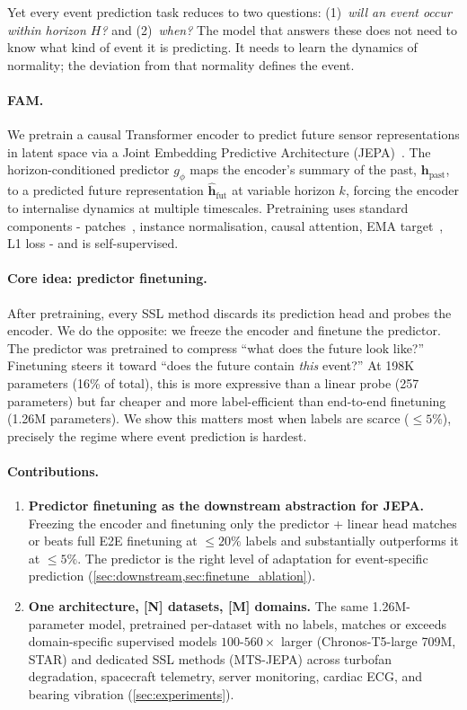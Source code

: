 \documentclass{article}
\newcommand{\placeholder}[1]{{\color{red}\textbf{[#1]}}}
\newcommand{\placeholder}[1]{#1}
\newcommand{\h}{\mathbf{h}}
\newcommand{\predictor}{g_\phi}
\begin{document}
Yet every event prediction task reduces to two questions: (1)~\emph{will an event occur within horizon $H$?} and (2)~\emph{when?} The model that answers these does not need to know what kind of event it is predicting. It needs to learn the dynamics of normality; the deviation from that normality defines the event.

\paragraph{FAM.} We pretrain a causal Transformer encoder to predict future sensor representations in latent space via a Joint Embedding Predictive Architecture (JEPA)~\citep{assran2023ijepa}. The horizon-conditioned predictor $\predictor$ maps the encoder's summary of the past, $\h_\text{past}$, to a predicted future representation $\hat{\h}_\text{fut}$ at variable horizon $k$, forcing the encoder to internalise dynamics at multiple timescales. Pretraining uses standard components - patches~\citep{nie2023patchtst}, instance normalisation, causal attention, EMA target~\citep{assran2023ijepa}, L1 loss - and is self-supervised.

\paragraph{Core idea: predictor finetuning.} After pretraining, every SSL method discards its prediction head and probes the encoder. We do the opposite: we freeze the encoder and finetune the predictor. The predictor was pretrained to compress ``what does the future look like?'' Finetuning steers it toward ``does the future contain \emph{this} event?'' At 198K parameters (16\% of total), this is more expressive than a linear probe (257 parameters) but far cheaper and more label-efficient than end-to-end finetuning (1.26M parameters). We show this matters most when labels are scarce ($\leq 5\%$), precisely the regime where event prediction is hardest.

\paragraph{Contributions.}
\begin{enumerate}[nosep]
  \item \textbf{Predictor finetuning as the downstream abstraction for JEPA.} Freezing the encoder and finetuning only the predictor + linear head matches or beats full E2E finetuning at $\leq 20\%$ labels and substantially outperforms it at $\leq 5\%$. The predictor is the right level of adaptation for event-specific prediction (\cref{sec:downstream,sec:finetune_ablation}).

  \item \textbf{One architecture, \placeholder{N} datasets, \placeholder{M} domains.} The same 1.26M-parameter model, pretrained per-dataset with no labels, matches or exceeds domain-specific supervised models $100$-$560\times$ larger (Chronos-T5-large 709M, STAR) and dedicated SSL methods (MTS-JEPA) across turbofan degradation, spacecraft telemetry, server monitoring, cardiac ECG, and bearing vibration (\cref{sec:experiments}).
\end{enumerate}
\end{document}
